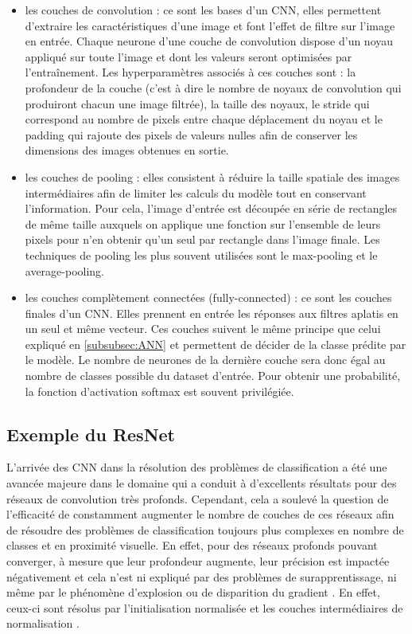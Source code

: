 \documentclass[12pt,english, openany]{book}
\begin{document}
\begin{itemize}
\item les couches de convolution : ce sont les bases d'un CNN, elles permettent d'extraire les caractéristiques d'une image et font l'effet de filtre sur l'image en entrée. Chaque neurone d'une couche de convolution dispose d'un noyau appliqué sur toute l'image et dont les valeurs seront optimisées par l'entraînement. Les hyperparamètres associés à ces couches sont : la profondeur de la couche (c'est à dire le nombre de noyaux de convolution qui produiront chacun une image filtrée), la taille des noyaux, le stride qui correspond au nombre de pixels entre chaque déplacement du noyau et le padding qui rajoute des pixels de valeurs nulles afin de conserver les dimensions des images obtenues en sortie.\\

\item les couches de pooling : elles consistent à réduire la taille spatiale des images intermédiaires afin de limiter les calculs du modèle tout en conservant l'information. Pour cela, l'image d'entrée est découpée en série de rectangles de même taille auxquels on applique une fonction sur l'ensemble de leurs pixels pour n'en obtenir qu'un seul par rectangle dans l'image finale. Les techniques de pooling les plus souvent utilisées sont le max-pooling et le average-pooling.\\

\item les couches complètement connectées (fully-connected) : ce sont les couches finales d'un CNN. Elles prennent en entrée les réponses aux filtres aplatis en un seul et même vecteur. Ces couches suivent le même principe que celui expliqué en \ref{subsubsec:ANN} et permettent de décider de la classe prédite par le modèle. Le nombre de neurones de la dernière couche sera donc égal au nombre de classes possible du dataset d'entrée. Pour obtenir une probabilité, la fonction d'activation softmax est souvent privilégiée.\\
\end{itemize}



\subsection{Exemple du ResNet}
\label{subsec:renet}
L'arrivée des CNN dans la résolution des problèmes de classification a été une avancée majeure dans le domaine qui a conduit à d'excellents résultats pour des réseaux de convolution très profonds. Cependant, cela a soulevé la question de l'efficacité de constamment augmenter le nombre de couches de ces réseaux afin de résoudre des problèmes de classification toujours plus complexes en nombre de classes et en proximité visuelle. En effet, pour des réseaux profonds pouvant converger, à mesure que leur profondeur augmente, leur précision est impactée négativement et cela n'est ni expliqué par des problèmes de surapprentissage, ni même par le phénomène d'explosion ou de disparition du gradient \cite{he2015deep}. En effet, ceux-ci sont résolus par l'initialisation normalisée \cite{LeCun1998} et les couches intermédiaires de normalisation \cite{ioffe2015batch}. \\
\end{document}
